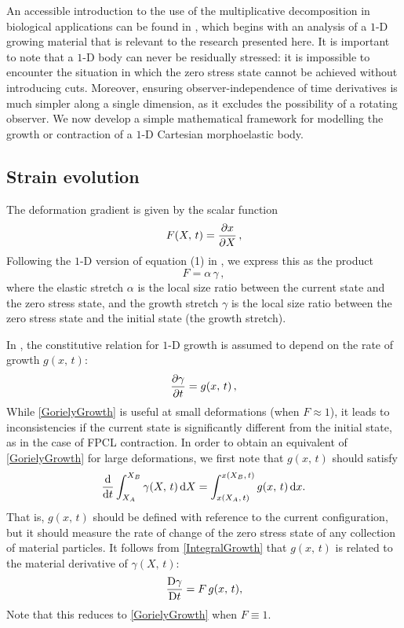 An accessible introduction to the use of the multiplicative decomposition in biological applications can be found in \citet{Goriely2011}, which begins with an analysis of a $1$-D growing material that is relevant to the research presented here.
It is important to note that a $1$-D body can never be residually stressed: it is impossible to encounter the situation in which the zero stress state cannot be achieved without introducing cuts. Moreover, ensuring observer-independence of time derivatives is much simpler along a single dimension, as it excludes the possibility of a rotating observer. We now develop a simple mathematical framework for modelling the growth or contraction of a $1$-D Cartesian morphoelastic body.

\subsection{Strain evolution}
\label{SS:Effstrain}

The deformation gradient is given by the scalar function
\[
 F(X,\,t) = \frac{\partial x}{\partial X}\,,
\]
Following the $1$-D version of equation (1) in \citet{Goriely2011}, we express this as the product
\begin{equation}
F = \alpha \, \gamma \,,
\label{eq:FGor}
\end{equation}
where  the elastic stretch $\alpha$ is the local size ratio between the current state and the zero stress state, and the growth stretch $\gamma$ is the local size ratio between the zero stress state and the initial state (the growth stretch).

In \citet{Goriely2011}, the constitutive relation for $1$-D growth is assumed to depend on the rate of growth $g(x,\,t)$:
\begin{equation}
 \frac{\partial \gamma}{\partial t} = g(x,\,t)\,, \label{GorielyGrowth}
\end{equation}
While \eqref{GorielyGrowth} is useful at small deformations (\ie when $F \approx 1$), it leads to  inconsistencies if the current state is significantly different from the initial state, as in the case of FPCL contraction. In order to obtain an equivalent of \eqref{GorielyGrowth} for large deformations, we first note that $g(x,\,t)$ should satisfy
\begin{equation}
 \frac{\mathrm{d} }{\mathrm{d} t} \int_{X_A}^{X_B} \gamma(X,\,t) \, \mathrm{d}X = \int_{x(X_A,\,t)}^{x(X_B,\,t)} g(x,\,t) \, \mathrm{d}x. \label{IntegralGrowth}
\end{equation}
That is, $g(x,\,t)$ should be defined with reference to the current configuration, but it should measure the rate of change of the zero stress state of any collection of material particles. It follows from \eqref{IntegralGrowth} that $g(x,\,t)$ is related to the material derivative of $\gamma(X,\,t)$:
\begin{equation}
 \frac{\mathrm{D} \gamma}{\mathrm{D} t} = F \, g(x,\,t), \label{gammaevol}
\end{equation}
Note that this reduces to \eqref{GorielyGrowth} when $F \equiv 1$.

